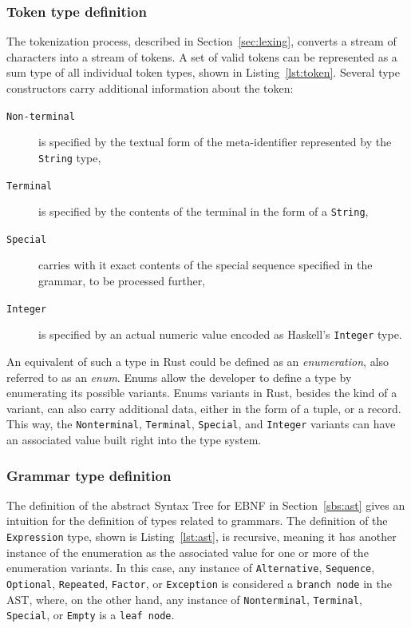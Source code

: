 \documentclass[english,bachelors,forcepolishlogotype]{wizthesis}
\begin{document}
\subsubsection*{Token type definition}


The tokenization process, described in Section~\ref{sec:lexing}, converts a
stream of characters into a stream of tokens. A set of valid tokens can be
represented as a sum type of all individual token types, shown in
Listing~\ref{lst:token}. Several type constructors carry additional information
about the token:
\begin{description}
  \item[\texttt{Non-terminal}] is specified by the textual form of the
  meta-identifier represented by the \texttt{String} type,
  \item[\texttt{Terminal}] is specified by the contents of the terminal in the
  form of a \texttt{String},
  \item[\texttt{Special}] carries with it exact contents of the special
  sequence specified in the grammar, to be processed further,
  \item[\texttt{Integer}] is specified by an actual numeric value encoded as
  Haskell's \texttt{Integer} type.
\end{description}

An equivalent of such a type in Rust could be defined as an \emph{enumeration},
also referred to as an \emph{enum}. Enums allow the developer to define a type
by enumerating its possible variants. Enums variants in Rust, besides the kind
of a variant, can also carry additional data, either in the form of a tuple, or
a record. This way, the \texttt{Nonterminal}, \texttt{Terminal},
\texttt{Special}, and \texttt{Integer} variants can have an associated value
built right into the type system.

\newpage

\subsubsection*{Grammar type definition}

The definition of the abstract Syntax Tree for EBNF in Section~\ref{sbs:ast}
gives an intuition for the definition of types related to grammars. The
definition of the \texttt{Expression} type, shown is Listing~\ref{lst:ast}, is
recursive, meaning it has another instance of the enumeration as the associated
value for one or more of the enumeration variants. In this case, any instance of
\texttt{Alternative}, \texttt{Sequence}, \texttt{Optional}, \texttt{Repeated},
\texttt{Factor}, or \texttt{Exception} is considered a \texttt{branch node} in
the AST, where, on the other hand, any instance of \texttt{Nonterminal},
\texttt{Terminal}, \texttt{Special}, or \texttt{Empty} is a \texttt{leaf node}.
\end{document}
